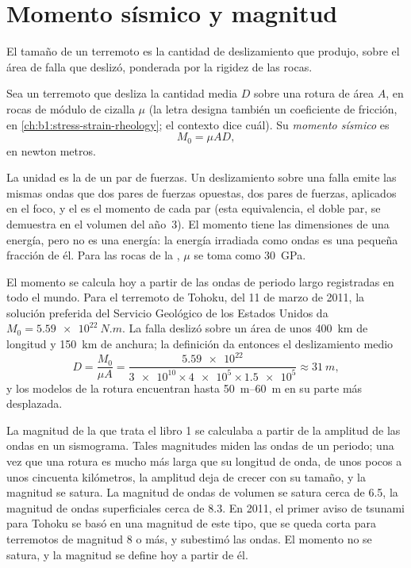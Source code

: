 \section{Momento sísmico y magnitud}\label{sec:b1:earthquake-source:moment}

El tamaño de un terremoto es la cantidad de deslizamiento que produjo, sobre el área de falla que deslizó, ponderada por la rigidez de
las rocas.

\begin{definition}\label{def:b1:earthquake-source:moment}
Sea un terremoto que desliza la cantidad media $D$ sobre una rotura de área $A$, en rocas de módulo de cizalla $\mu$ (la letra
designa también un coeficiente de fricción, en \cref{ch:b1:stress-strain-rheology}; el contexto dice cuál). Su \emph{momento sísmico}
es
\[
  M_0 = \mu A D ,
\]
en newton metros.
\end{definition}

La unidad es la de un par de fuerzas. Un deslizamiento sobre una falla emite las mismas ondas que dos pares de fuerzas opuestas,
dos pares de fuerzas, aplicados en el foco, y el  es el momento de cada par (esta equivalencia, el doble par, se
demuestra en el volumen del año~3). El momento tiene las dimensiones de una energía, pero no es una energía: la energía irradiada
como ondas es una pequeña fracción de él. Para las rocas de la , $\mu$ se toma como \qty{30}{GPa}.

El momento se calcula hoy a partir de las ondas de periodo largo registradas en todo el mundo. Para el terremoto de Tohoku, del 11 de
marzo de 2011, la solución preferida del Servicio Geológico de los Estados Unidos da $M_0 = \qty{5.59e22}{N.m}$. La falla deslizó sobre
un área de unos \qty{400}{km} de longitud y \qty{150}{km} de anchura; la definición da entonces el deslizamiento medio
\[
  D = \frac{M_0}{\mu A}
    = \frac{\num{5.59e22}}{\num{3e10}\times\num{4e5}\times\num{1.5e5}}
    \approx \qty{31}{m} ,
\]
y los modelos de la rotura encuentran hasta \qtyrange{50}{60}{m} en su parte más desplazada.

La magnitud de la que trata el libro 1 se calculaba a partir de la amplitud de las ondas en un sismograma. Tales magnitudes miden las
ondas de un periodo; una vez que una rotura es mucho más larga que su longitud de onda, de unos pocos a unos cincuenta kilómetros, la
amplitud deja de crecer con su tamaño, y la magnitud se satura. La magnitud de ondas de volumen se satura cerca de 6.5, la magnitud de
ondas superficiales cerca de 8.3. En 2011, el primer aviso de tsunami para Tohoku se basó en una magnitud de este tipo, que se queda
corta para terremotos de magnitud 8 o más, y subestimó las ondas. El momento no se satura, y la magnitud se define hoy a partir de él.


